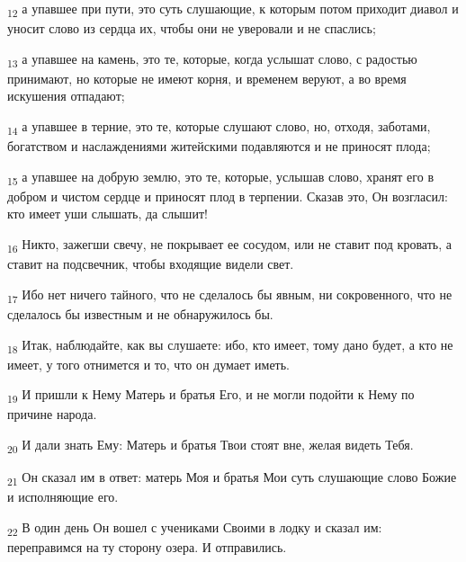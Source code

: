 \begin{tcolorbox}
\textsubscript{12} а упавшее при пути, это суть слушающие, к которым потом приходит диавол и уносит слово из сердца их, чтобы они не уверовали и не спаслись;
\end{tcolorbox}
\begin{tcolorbox}
\textsubscript{13} а упавшее на камень, это те, которые, когда услышат слово, с радостью принимают, но которые не имеют корня, и временем веруют, а во время искушения отпадают;
\end{tcolorbox}
\begin{tcolorbox}
\textsubscript{14} а упавшее в терние, это те, которые слушают слово, но, отходя, заботами, богатством и наслаждениями житейскими подавляются и не приносят плода;
\end{tcolorbox}
\begin{tcolorbox}
\textsubscript{15} а упавшее на добрую землю, это те, которые, услышав слово, хранят его в добром и чистом сердце и приносят плод в терпении. Сказав это, Он возгласил: кто имеет уши слышать, да слышит!
\end{tcolorbox}
\begin{tcolorbox}
\textsubscript{16} Никто, зажегши свечу, не покрывает ее сосудом, или не ставит под кровать, а ставит на подсвечник, чтобы входящие видели свет.
\end{tcolorbox}
\begin{tcolorbox}
\textsubscript{17} Ибо нет ничего тайного, что не сделалось бы явным, ни сокровенного, что не сделалось бы известным и не обнаружилось бы.
\end{tcolorbox}
\begin{tcolorbox}
\textsubscript{18} Итак, наблюдайте, как вы слушаете: ибо, кто имеет, тому дано будет, а кто не имеет, у того отнимется и то, что он думает иметь.
\end{tcolorbox}
\begin{tcolorbox}
\textsubscript{19} И пришли к Нему Матерь и братья Его, и не могли подойти к Нему по причине народа.
\end{tcolorbox}
\begin{tcolorbox}
\textsubscript{20} И дали знать Ему: Матерь и братья Твои стоят вне, желая видеть Тебя.
\end{tcolorbox}
\begin{tcolorbox}
\textsubscript{21} Он сказал им в ответ: матерь Моя и братья Мои суть слушающие слово Божие и исполняющие его.
\end{tcolorbox}
\begin{tcolorbox}
\textsubscript{22} В один день Он вошел с учениками Своими в лодку и сказал им: переправимся на ту сторону озера. И отправились.
\end{tcolorbox}
